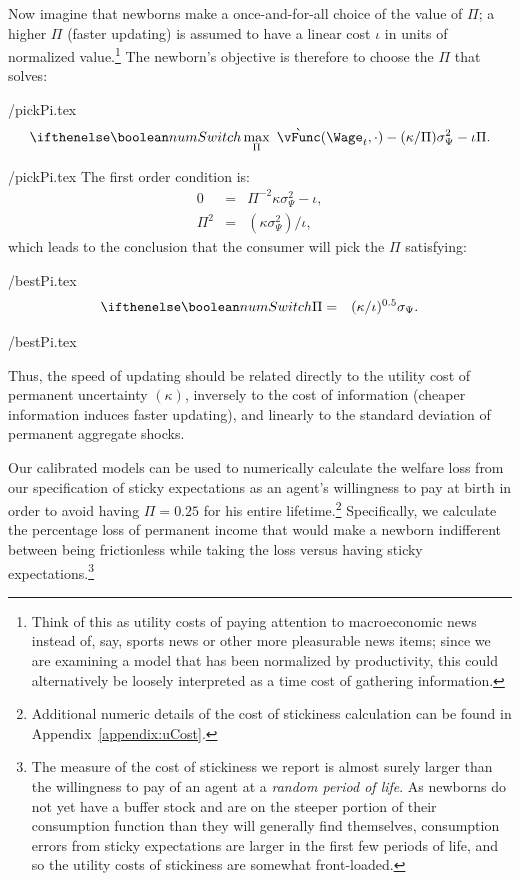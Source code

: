 \documentclass[titlepage]{\econtex}\newcommand{\texname}{cAndCwithStickyE}
\begin{document}
Now imagine that newborns make a once-and-for-all choice of the value of $\Pi$; a higher $\Pi$ (faster updating) is assumed to have a linear cost $\iota$ in units of normalized value.\footnote{Think of this as utility costs of paying attention to macroeconomic news instead of, say, sports news or other more pleasurable news items; since we are examining a model that has been normalized by productivity, this could alternatively be loosely interpreted as a time cost of gathering information.}  The newborn's objective is therefore to choose the $\Pi$ that solves:
\begin{verbatimwrite}{\eq/pickPi.tex}
\begin{eqnarray}
\ifnumSw  \max_{\Pi} ~ \grave{\vFunc}(\Wage_t,\cdot)-(\kappa/\Pi)\sigma^{2}_{\Psi}-\iota\Pi. \label{eq:pickPi}
\end{eqnarray}
\end{verbatimwrite}
 \eq/pickPi.tex
The first order condition is:
\begin{eqnarray*}
     0 & = & \Pi^{-2}\kappa\sigma^{2}_{\Psi}-\iota,
\\  \Pi^{2} & = & (\kappa \sigma^{2}_{\Psi})/\iota,
\end{eqnarray*}
which leads to the conclusion that the consumer will
pick the $\Pi$ satisfying:
\begin{verbatimwrite}{\eq/bestPi.tex}
\begin{eqnarray}
\ifnumSw \Pi & = &  (\kappa/\iota)^{0.5} \sigma_{\Psi}. \label{eq:bestPi}
\end{eqnarray}
\end{verbatimwrite}
 \eq/bestPi.tex

Thus, the speed of updating should be related directly to the utility cost of permanent uncertainty $(\kappa)$, inversely to the cost of information (cheaper information induces faster updating), and linearly to the standard deviation of permanent aggregate shocks.

Our calibrated models can be used to numerically calculate the welfare loss from our specification of sticky expectations as an agent's willingness to pay at birth in order to avoid having $\Pi=0.25$ for his entire lifetime.\footnote{Additional numeric details of the cost of stickiness calculation can be found in Appendix~\ref{appendix:uCost}.}  Specifically, we calculate the percentage loss of permanent income that would make a newborn indifferent between being frictionless while taking the loss versus having sticky expectations.\footnote{The measure of the cost of stickiness we report is almost surely larger than the willingness to pay of an agent at a \textit{random period of life}.  As newborns do not yet have a buffer stock and are on the steeper portion of their consumption function than they will generally find themselves, consumption errors from sticky expectations are larger in the first few periods of life, and so the utility costs of stickiness are somewhat front-loaded.}
\end{document}
